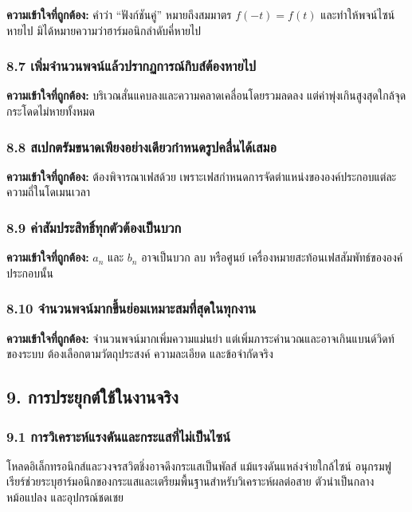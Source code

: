 \textbf{ความเข้าใจที่ถูกต้อง:} คำว่า ``ฟังก์ชันคู่'' หมายถึงสมมาตร \(f(-t)=f(t)\) และทำให้พจน์ไซน์หายไป มิได้หมายความว่าฮาร์มอนิกลำดับคี่หายไป

\subsubsection{8.7 เพิ่มจำนวนพจน์แล้วปรากฏการณ์กิบส์ต้องหายไป}

\textbf{ความเข้าใจที่ถูกต้อง:} บริเวณสั่นแคบลงและความคลาดเคลื่อนโดยรวมลดลง แต่ค่าพุ่งเกินสูงสุดใกล้จุดกระโดดไม่หายทั้งหมด

\subsubsection{8.8 สเปกตรัมขนาดเพียงอย่างเดียวกำหนดรูปคลื่นได้เสมอ}

\textbf{ความเข้าใจที่ถูกต้อง:} ต้องพิจารณาเฟสด้วย เพราะเฟสกำหนดการจัดตำแหน่งขององค์ประกอบแต่ละความถี่ในโดเมนเวลา

\subsubsection{8.9 ค่าสัมประสิทธิ์ทุกตัวต้องเป็นบวก}

\textbf{ความเข้าใจที่ถูกต้อง:} \(a_n\) และ \(b_n\) อาจเป็นบวก ลบ หรือศูนย์ เครื่องหมายสะท้อนเฟสสัมพัทธ์ขององค์ประกอบนั้น

\subsubsection{8.10 จำนวนพจน์มากขึ้นย่อมเหมาะสมที่สุดในทุกงาน}

\textbf{ความเข้าใจที่ถูกต้อง:} จำนวนพจน์มากเพิ่มความแม่นยำ แต่เพิ่มภาระคำนวณและอาจเกินแบนด์วิดท์ของระบบ ต้องเลือกตามวัตถุประสงค์ ความละเอียด และข้อจำกัดจริง


\subsection{9. การประยุกต์ใช้ในงานจริง}

\subsubsection{9.1 การวิเคราะห์แรงดันและกระแสที่ไม่เป็นไซน์}

โหลดอิเล็กทรอนิกส์และวงจรสวิตชิ่งอาจดึงกระแสเป็นพัลส์ แม้แรงดันแหล่งจ่ายใกล้ไซน์ อนุกรมฟูเรียร์ช่วยระบุฮาร์มอนิกของกระแสและเตรียมพื้นฐานสำหรับวิเคราะห์ผลต่อสาย ตัวนำเป็นกลาง หม้อแปลง และอุปกรณ์ชดเชย

